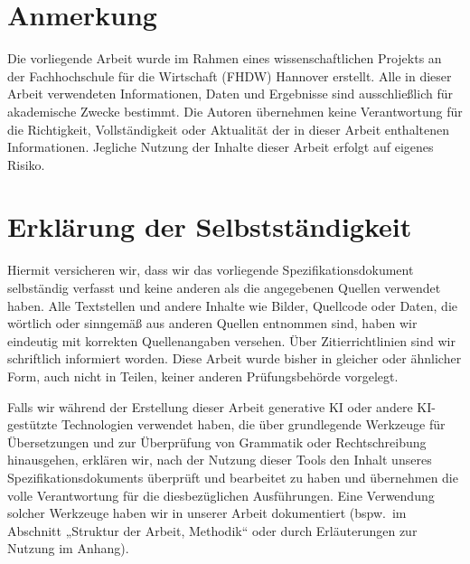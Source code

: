 \section*{Anmerkung}
\label{sec:anmerkung}
Die vorliegende Arbeit wurde im Rahmen eines wissenschaftlichen Projekts an der Fachhochschule für die Wirtschaft (FHDW) Hannover erstellt. Alle in dieser Arbeit verwendeten Informationen, Daten und Ergebnisse sind ausschließlich für akademische Zwecke bestimmt. Die Autoren übernehmen keine Verantwortung für die Richtigkeit, Vollständigkeit oder Aktualität der in dieser Arbeit enthaltenen Informationen. Jegliche Nutzung der Inhalte dieser Arbeit erfolgt auf eigenes Risiko.

\vspace{2em}

\section*{Erklärung der Selbstständigkeit}
\label{sec:erklaerung_der_selbstaendigkeit}
Hiermit versicheren wir, dass wir das vorliegende Spezifikationsdokument selbständig verfasst und keine anderen als die angegebenen Quellen verwendet haben. Alle Textstellen und andere Inhalte wie Bilder, Quellcode oder Daten, die wörtlich oder sinngemäß aus anderen Quellen entnommen sind, haben wir eindeutig mit korrekten Quellenangaben versehen. Über Zitierrichtlinien sind wir schriftlich informiert worden. Diese Arbeit wurde bisher in gleicher oder ähnlicher Form, auch nicht in Teilen, keiner anderen Prüfungsbehörde vorgelegt.

Falls wir während der Erstellung dieser Arbeit generative KI oder andere KI-gestützte Technologien verwendet haben, die über grundlegende Werkzeuge für Übersetzungen und zur Überprüfung von Grammatik oder Rechtschreibung hinausgehen, erklären wir, nach der Nutzung dieser Tools den Inhalt unseres Spezifikationsdokuments überprüft und bearbeitet zu haben und übernehmen die volle Verantwortung für die diesbezüglichen Ausführungen. Eine Verwendung solcher Werkzeuge haben wir in unserer Arbeit dokumentiert (bspw.\ im Abschnitt „Struktur der Arbeit, Methodik“ oder durch Erläuterungen zur Nutzung im Anhang).